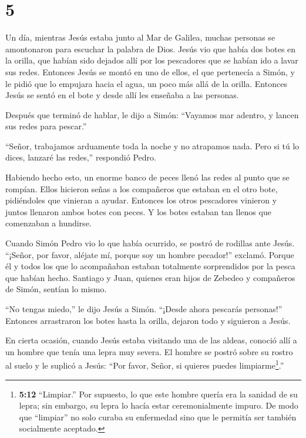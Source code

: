\hypertarget{section-4}{%
\section{5}\label{section-4}}

 Un día, mientras Jesús estaba junto al Mar de Galilea,
muchas personas se amontonaron para escuchar la palabra de Dios.
 Jesús vio que había dos botes en la orilla, que habían sido
dejados allí por los pescadores que se habían ido a lavar sus redes.
 Entonces Jesús se montó en uno de ellos, el que pertenecía
a Simón, y le pidió que lo empujara hacia el agua, un poco más allá de
la orilla. Entonces Jesús se sentó en el bote y desde allí les enseñaba
a las personas.

 Después que terminó de hablar, le dijo a Simón: ``Vayamos
mar adentro, y lancen sus redes para pescar.''

 ``Señor, trabajamos arduamente toda la noche y no atrapamos
nada. Pero si tú lo dices, lanzaré las redes,'' respondió Pedro.

 Habiendo hecho esto, un enorme banco de peces llenó las
redes al punto que se rompían.  Ellos hicieron señas a los
compañeros que estaban en el otro bote, pidiéndoles que vinieran a
ayudar. Entonces los otros pescadores vinieron y juntos llenaron ambos
botes con peces. Y los botes estaban tan llenos que comenzaban a
hundirse.

 Cuando Simón Pedro vio lo que había ocurrido, se postró de
rodillas ante Jesús. ``¡Señor, por favor, aléjate mí, porque soy un
hombre pecador!'' exclamó.  Porque él y todos los que lo
acompañaban estaban totalmente sorprendidos por la pesca que habían
hecho.  Santiago y Juan, quienes eran hijos de Zebedeo y
compañeros de Simón, sentían lo mismo.

``No tengas miedo,'' le dijo Jesús a Simón. ``¡Desde ahora pescarás
personas!''  Entonces arrastraron los botes hasta la
orilla, dejaron todo y siguieron a Jesús.

 En cierta ocasión, cuando Jesús estaba visitando una de
las aldeas, conoció allí a un hombre que tenía una lepra muy severa. El
hombre se postró sobre su rostro al suelo y le suplicó a Jesús: ``Por
favor, Señor, si quieres puedes limpiarme\footnote{\textbf{5:12}
  ``Limpiar.'' Por supuesto, lo que este hombre quería era la sanidad de
  su lepra; sin embargo, su lepra lo hacía estar ceremonialmente impuro.
  De modo que ``limpiar'' no solo curaba su enfermedad sino que le
  permitía ser también socialmente aceptado.}.''


